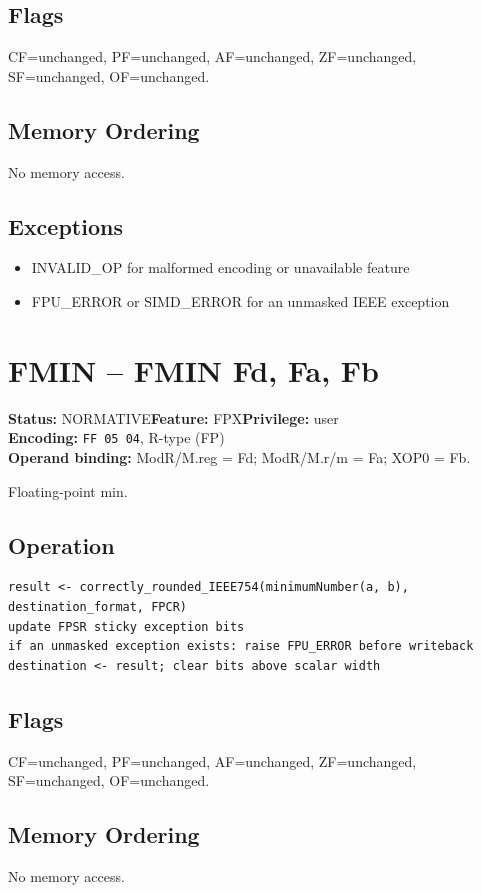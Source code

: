 \documentclass[10pt]{article}
\begin{document}
\subsection*{Flags}
CF=unchanged, PF=unchanged, AF=unchanged, ZF=unchanged, SF=unchanged, OF=unchanged.
\subsection*{Memory Ordering}
No memory access.
\subsection*{Exceptions}
\begin{itemize}
\item INVALID\_OP for malformed encoding or unavailable feature
\item FPU\_ERROR or SIMD\_ERROR for an unmasked IEEE exception
\end{itemize}
\clearpage

\section{FMIN -- FMIN Fd, Fa, Fb}
\textbf{Status:} NORMATIVE\quad \textbf{Feature:} FPX\quad \textbf{Privilege:} user\\
\textbf{Encoding:} \texttt{FF 05 04}, R-type (FP)\\
\textbf{Operand binding:} ModR/M.reg = Fd; ModR/M.r/m = Fa; XOP0 = Fb.

Floating-point min.

\subsection*{Operation}
\begin{lstlisting}
result <- correctly_rounded_IEEE754(minimumNumber(a, b), destination_format, FPCR)
update FPSR sticky exception bits
if an unmasked exception exists: raise FPU_ERROR before writeback
destination <- result; clear bits above scalar width
\end{lstlisting}
\subsection*{Flags}
CF=unchanged, PF=unchanged, AF=unchanged, ZF=unchanged, SF=unchanged, OF=unchanged.
\subsection*{Memory Ordering}
No memory access.
\end{document}
